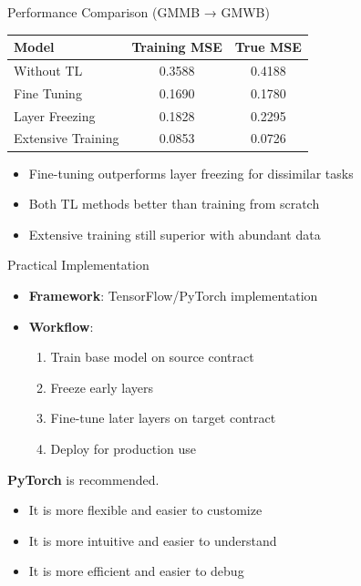     \begin{frame}{Performance Comparison (GMMB → GMWB)}
    \begin{table}
    \begin{tabular}{lcc}
    \toprule
    \textbf{Model} & \textbf{Training MSE} & \textbf{True MSE} \\
    \midrule
    Without TL & 0.3588 & 0.4188 \\
    Fine Tuning & 0.1690 & 0.1780 \\
    Layer Freezing & 0.1828 & 0.2295 \\
    Extensive Training & 0.0853 & 0.0726 \\
    \bottomrule
    \end{tabular}
    \end{table}
    
    \begin{itemize}
        \item Fine-tuning outperforms layer freezing for dissimilar tasks
        \item Both TL methods better than training from scratch
        \item Extensive training still superior with abundant data
    \end{itemize}
    \end{frame}
    
    \begin{frame}{Practical Implementation}
    \begin{itemize}
        \item \textbf{Framework}: TensorFlow/PyTorch implementation
        \item \textbf{Workflow}:
        \begin{enumerate}
            \item Train base model on source contract
            \item Freeze early layers
            \item Fine-tune later layers on target contract
            \item Deploy for production use
        \end{enumerate}
    \end{itemize}
    
    \textbf{PyTorch} is recommended.
    \begin{itemize}
        \item It is more flexible and easier to customize
        \item It is more intuitive and easier to understand 
        \item It is more efficient and easier to debug
    \end{itemize}
    \end{frame}
    
